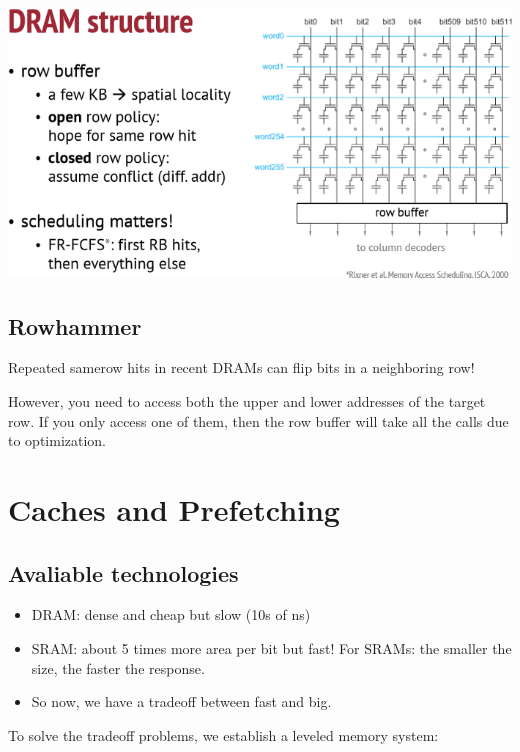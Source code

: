 \documentclass[letterpaper,12pt]{article}
\begin{document}
\includegraphics{Image/DRAM_structure.png}

\subsection{Rowhammer}

Repeated same\-row hits in recent DRAMs can flip bits in a neighboring row!

However, you need to access both the upper and lower addresses of the target row. If you only access one of them, then the row buffer will take all the calls due to optimization.

\section{Caches and Prefetching}

\subsection{Avaliable technologies}

\begin{itemize}
    \item DRAM: dense and cheap but slow (10s of ns)
    \item SRAM: about 5 times more area per bit but fast!
          For SRAMs: the smaller the size, the faster the response.
    \item  So now, we have a tradeoff between fast and big.
\end{itemize}

To solve the tradeoff problems, we establish a leveled memory system:
\end{document}
